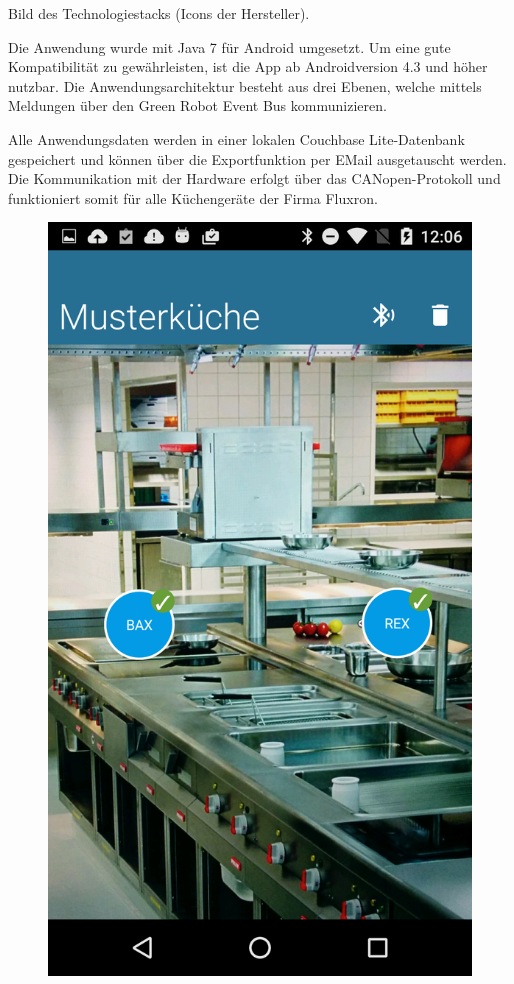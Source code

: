 Bild des Technologiestacks (Icons der Hersteller).

Die Anwendung wurde mit Java 7 für Android umgesetzt. Um eine gute Kompatibilität zu gewährleisten, ist die App ab Androidversion 4.3 und höher nutzbar. Die Anwendungsarchitektur besteht aus drei Ebenen, welche mittels Meldungen über den Green Robot Event Bus kommunizieren.

Alle Anwendungsdaten werden in einer lokalen Couchbase Lite-Datenbank gespeichert und können über die Exportfunktion per EMail ausgetauscht werden. Die Kommunikation mit der Hardware erfolgt über das CANopen-Protokoll und funktioniert somit für alle Küchengeräte der Firma Fluxron.

\begin{figure}
	\vspace{-1.1cm}
	\begin{center}
		\includegraphics[scale=0.12]{start/img/screenshot}
	\end{center}
	\vspace{-1cm}
\end{figure}

